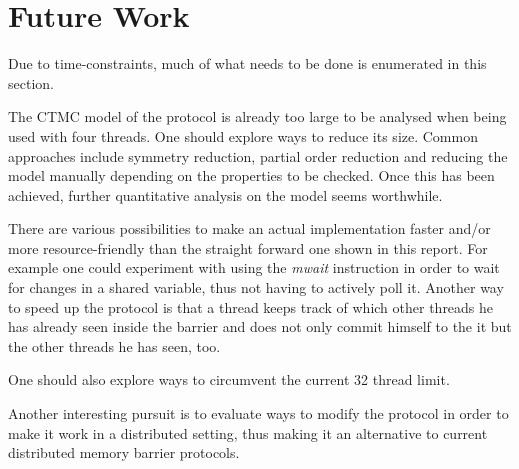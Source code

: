 \documentclass[a4paper, 10pt]{article}
\begin{document}
\section{Future Work}
Due to time-constraints, much of what needs to be done is enumerated in this section.

The CTMC model of the protocol is already too large to be analysed when being used with four threads. One should explore ways to reduce its size. Common approaches include symmetry reduction, partial order reduction and reducing the model manually depending on the properties to be checked. Once this has been achieved, further quantitative analysis on the model seems worthwhile.

There are various possibilities to make an actual implementation faster and/or more resource-friendly than the straight forward one shown in this report. For example one could experiment with using the \emph{mwait} instruction in order to wait for changes in a shared variable, thus not having to actively poll it. Another way to speed up the protocol is that a thread keeps track of which other threads he has already seen inside the barrier and does not only commit himself to the it but the other threads he has seen, too.

One should also explore ways to circumvent the current 32 thread limit.

Another interesting pursuit is to evaluate ways to modify the protocol in order to make it work in a distributed setting, thus making it an alternative to current distributed memory barrier protocols.

\nocite{*} %

{}
\end{document}
